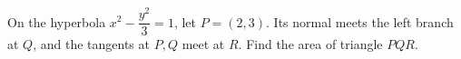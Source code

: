On the hyperbola $x^2-\dfrac{y^2}{3}=1$, let $P=(2,3)$. Its normal meets the left branch at $Q$, and the tangents at $P,Q$ meet at $R$. Find the area of triangle $PQR$.
